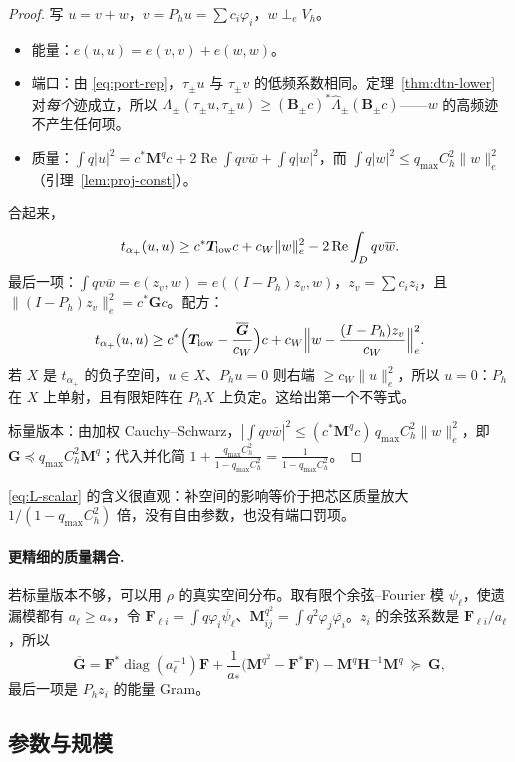 \documentclass[11pt,a4paper,fontset=fandol]{ctexart}
\begin{document}
\begin{proof}
写 $u=v+w$，$v=P_hu=\sum c_i\varphi_i$，$w\perp_eV_h$。
\begin{itemize}
\item 能量：$e(u,u)=e(v,v)+e(w,w)$。
\item 端口：由 \eqref{eq:port-rep}，$\tau_\pm u$ 与 $\tau_\pm v$ 的低频系数相同。定理~\ref{thm:dtn-lower} 对\emph{每个}迹成立，所以 $\Lambda_\pm(\tau_\pm u,\tau_\pm u)\ge(\bm B_\pm c)^*\hat\Lambda_\pm(\bm B_\pm c)$——$w$ 的高频迹不产生任何项。
\item 质量：$\int q|u|^2=c^*\bm M^qc+2\operatorname{Re}\int qv\overline w+\int q|w|^2$，而 $\int q|w|^2\le q_{\max}C_h^2\|w\|_e^2$（引理~\ref{lem:proj-const}）。
\end{itemize}
合起来，
\[
t_{\alpha_+}(u,u)\ge c^*\bm T_{\rm low}c+c_W\|w\|_e^2-2\operatorname{Re}\int_Dqv\overline w .
\]
最后一项：$\int qv\overline w=e(z_v,w)=e((I-P_h)z_v,w)$，$z_v=\sum c_iz_i$，且 $\|(I-P_h)z_v\|_e^2=c^*\bm Gc$。配方：
\[
t_{\alpha_+}(u,u)\ge c^*\Bigl(\bm T_{\rm low}-\frac{\overline{\bm G}}{c_W}\Bigr)c+c_W\Bigl\|w-\frac{(I-P_h)z_v}{c_W}\Bigr\|_e^2 .
\]
若 $X$ 是 $t_{\alpha_+}$ 的负子空间，$u\in X$、$P_hu=0$ 则右端 $\ge c_W\|u\|_e^2$，所以 $u=0$：$P_h$ 在 $X$ 上单射，且有限矩阵在 $P_hX$ 上负定。这给出第一个不等式。

标量版本：由加权 Cauchy--Schwarz，$|\int qv\overline w|^2\le(c^*\bm M^qc)\,q_{\max}C_h^2\|w\|_e^2$，即 $\bm G\preceq q_{\max}C_h^2\bm M^q$；代入并化简 $1+\frac{q_{\max}C_h^2}{1-q_{\max}C_h^2}=\frac1{1-q_{\max}C_h^2}$。
\end{proof}

\eqref{eq:L-scalar} 的含义很直观：补空间的影响等价于把芯区质量放大 $1/(1-q_{\max}C_h^2)$ 倍，没有自由参数，也没有端口罚项。

\paragraph{更精细的质量耦合.} 若标量版本不够，可以用 $\rho$ 的真实空间分布。取有限个余弦--Fourier 模 $\psi_\ell$，使遗漏模都有 $a_\ell\ge a_*$，令 $\bm F_{\ell i}=\int q\varphi_i\overline{\psi_\ell}$、$\bm M^{q^2}_{ij}=\int q^2\varphi_j\overline{\varphi_i}$。$z_i$ 的余弦系数是 $\bm F_{\ell i}/a_\ell$，所以
\[
\overline{\bm G}=\bm F^*\operatorname{diag}(a_\ell^{-1})\bm F+\frac1{a_*}\bigl(\bm M^{q^2}-\bm F^*\bm F\bigr)-\bm M^q\bm H^{-1}\bm M^q\ \succeq\ \bm G ,
\]
最后一项是 $P_hz_i$ 的能量 Gram。

\subsection{参数与规模}
\end{document}
